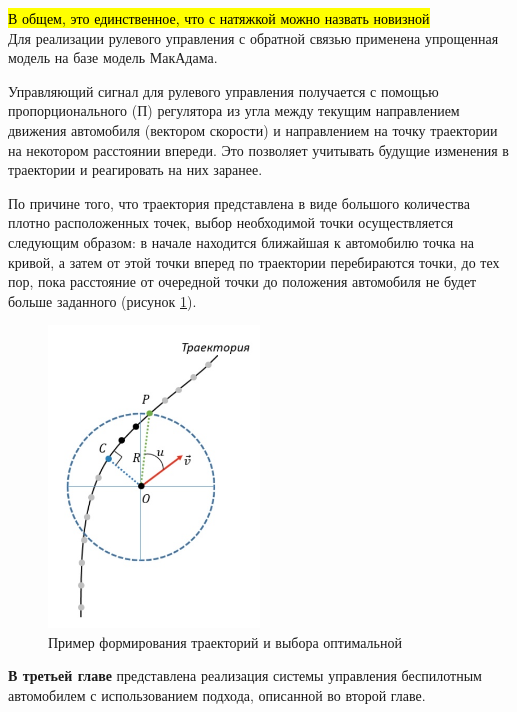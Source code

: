 \hl{В общем, это единственное, что с натяжкой можно назвать новизной}
\\

Для реализации рулевого управления с обратной связью применена упрощенная модель на базе
модель МакАдама.

Управляющий сигнал для рулевого управления получается с помощью пропорционального (П) регулятора
из угла между текущим направлением движения автомобиля (вектором скорости) и направлением на
точку траектории на некотором расстоянии впереди. Это позволяет учитывать будущие изменения
в траектории и реагировать на них заранее.

По причине того, что траектория представлена в виде большого количества плотно расположенных
точек, выбор необходимой точки осуществляется следующим образом: в начале находится ближайшая к автомобилю
точка на кривой, а затем от этой точки вперед по траектории перебираются точки, до тех пор, пока
расстояние от очередной точки до положения автомобиля не будет больше заданного (рисунок \ref{img:path_moving}).

\begin{figure}[h]
    \centering
    \includegraphics[width=0.5\textwidth]{images/path_moving}
    \caption{Пример формирования траекторий и выбора оптимальной}
    \label{img:path_moving}
\end{figure}


\textbf{В третьей главе} представлена реализация системы управления беспилотным автомобилем с
использованием подхода, описанной во второй главе.

